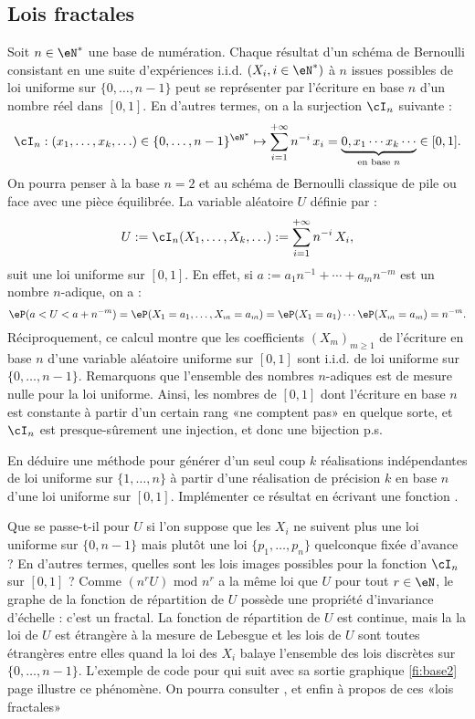 %
\subsection{Lois fractales}
\label{ss:lois-fractales}
%

Soit $n\in\eN^*$ une base de numération.  Chaque résultat d'un schéma de
Bernoulli consistant en une suite d'expériences i.i.d. $(X_i,i\in\eN^*)$ à $n$
issues possibles de loi uniforme sur $\{0,\ldots,n-1\}$ peut se représenter
par l'écriture en base $n$ d'un nombre réel dans $[0,1]$. En d'autres termes,
on a la surjection $\cI_n$ suivante :
$$
\cI_n: (x_1,\ldots,x_k,\ldots)\in\{0,\ldots,n-1\}^{\eN^*} 
\mapsto \sum_{i=1}^{+\infty} n^{-i}\,x_i 
= \underbrace{0,x_1\cdots x_k\cdots}_{\text{en base }n} \in [0,1].
$$
On pourra penser à la base $n=2$ et au schéma de Bernoulli classique de pile ou face
avec une pièce équilibrée. La variable aléatoire $U$ définie par :
$$
U:=\cI_n(X_1,\ldots,X_k,\ldots):=\sum_{i=1}^{+\infty} n^{-i}\,X_i,
$$
suit une loi uniforme sur $[0,1]$.  
En effet, si $a:=a_1 n^{-1}+\cdots+a_m n^{-m}$ est un nombre $n$-adique, on a :
$$
\eP( a < U < a+n^{-m})
=
\eP( X_1 = a_1,\ldots,X_m=a_m)
=
\eP( X_1 = a_1) \cdots \eP(X_m=a_m)
=
n^{-m}.
$$
Réciproquement, ce calcul montre que les coefficients $(X_m)_{m\geq 1}$ de
l'écriture en base $n$ d'une variable aléatoire uniforme sur $[0,1]$ sont
i.i.d. de loi uniforme sur $\{0,\ldots,n-1\}$. Remarquons que l'ensemble des
nombres $n$-adiques est de mesure nulle pour la loi uniforme. Ainsi, les
nombres de $[0,1]$ dont l'écriture en base $n$ est constante à partir d'un
certain rang «ne comptent pas» en quelque sorte, et $\cI_n$ est
presque-sûrement une injection, et donc une bijection p.s.

\begin{exo}
  En déduire une méthode pour générer d'un seul coup $k$ réalisations
  indépendantes de loi uniforme sur $\{1,\ldots,n\}$ à partir d'une
  réalisation de précision $k$ en base $n$ d'une loi uniforme sur $[0,1]$.
  Implémenter ce résultat en écrivant une fonction \ML.
\end{exo}

Que se passe-t-il pour $U$ si l'on suppose que les $X_i$ ne suivent plus une
loi uniforme sur $\{0,n-1\}$ mais plutôt une loi $\{p_1,\ldots,p_n\}$ quelconque fixée
d'avance ? En d'autres termes, quelles sont les lois images possibles pour la
fonction $\cI_n$ sur $[0,1]$ ?  Comme $(n^rU)\text{ mod } n^r$ a la même loi
que $U$ pour tout $r\in\eN$, le graphe de la fonction de répartition de $U$
possède une propriété d'invariance d'échelle : c'est un fractal. La fonction
de répartition de $U$ est continue, mais la la loi de $U$ est étrangère à la
mesure de Lebesgue et les lois de $U$ sont toutes étrangères entre elles quand
la loi des $X_i$ balaye l'ensemble des lois discrètes sur $\{0,\ldots,n-1\}$.
L'exemple de code pour \OC{} qui suit avec sa sortie graphique \ref{fi:base2}
page \pageref{fi:base2} illustre ce phénomène. On pourra consulter \cite[exe.
3.3.15 page 81]{dacunha-castelle-duflo}, \cite[expl. IV.3.6.iii pages 100-103
et V.5.3 page 144]{barbe-ledoux} et enfin \cite[exe. V.6.15 page
155]{barbe-ledoux} à propos de ces «lois fractales»


